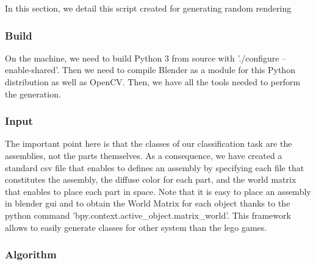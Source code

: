 \documentclass[10pt,twocolumn,letterpaper]{article}
\begin{document}
In this section, we detail this script created for generating random rendering 

\subsubsection{Build}

On the machine, we need to build Python 3 from source with './configure --enable-shared'. Then we need 
to compile Blender as a module for this Python distribution as well as OpenCV. Then, we have all the tools 
needed to perform the generation.

\subsubsection{Input}

The important point here is that the classes of our classification task are the assemblies, not the parts 
themselves. As a consequence, we have created a standard csv file that enables to defines an assembly by 
specifying each file that constitutes the assembly, the diffuse color for each part, and the world matrix 
that enables to place each part in space. 
Note that it is easy to place an assembly in blender gui and to obtain the World Matrix for each object 
thanks to the python command 'bpy.context.active\_object.matrix\_world'.
This framework allows to easily generate classes for other system than the lego games.

\subsubsection{Algorithm}
\end{document}
